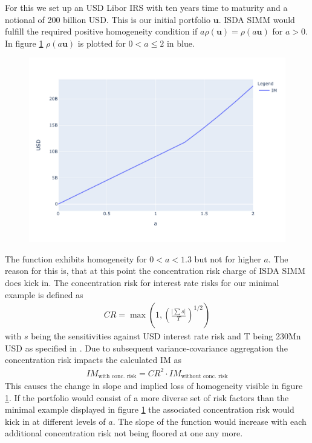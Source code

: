 \documentclass[../Thesis_AHoecherl.tex]{subfiles}
\begin{document}
    For this we set up an USD Libor IRS with ten years time to maturity and a notional of 200 billion USD. This is our initial portfolio $\mathbf{u}$. \gls{ISDA SIMM} would fulfill the required positive homogeneity condition if $a \rho(\mathbf{u}) = \rho(a \mathbf{u})$ for $a>0$. In figure \ref{fig:homogeneity of ISDA SIMM} $\rho(a\mathbf{u})$ is plotted for $0<a\leq 2$ in blue. 
    \begin{figure}
        \centering
        \includegraphics{Graphics/ISDA_SIMM_homogenity.pdf}
        \caption{}
        \label{fig:homogeneity of ISDA SIMM}
    \end{figure}
    The function exhibits homogeneity for $0<a<1.3$ but not for higher $a$. 
    The reason for this is, that at this point the concentration risk charge of \gls{ISDA SIMM} does kick in.
    The concentration risk for interest rate risks for our minimal example is defined as \cite[Article 7.b]{SIMM}
    \begin{align*}
        CR = \max\left(1,\left(\frac{\lvert\sum{s}\rvert}{T}\right)^{1/2}\right)
    \end{align*}
    with $s$ being the sensitivities against USD interest rate risk and T being 230Mn USD as specified in \cite[Article 74]{SIMM}. Due to subsequent variance-covariance aggregation the concentration risk impacts the calculated IM as
    \begin{align*}
        IM_{\text{with conc. risk}} = CR^2 \cdot IM_{\text{without conc. risk}}
    \end{align*}
    This causes the change in slope and implied loss of homogeneity visible in figure \ref{fig:homogeneity of ISDA SIMM}. If the portfolio would consist of a more diverse set of risk factors than the minimal example displayed in figure \ref{fig:homogeneity of ISDA SIMM} the associated concentration risk would kick in at different levels of $a$.
    The slope of the function would increase with each additional concentration risk not being floored at one any more. 
    
\end{document}
